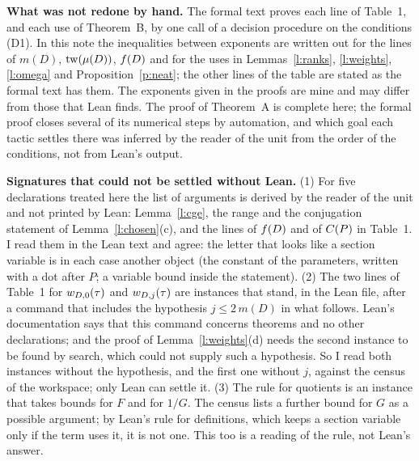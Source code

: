 \documentclass[11pt,a4paper]{article}
\newcommand{\subhead}[1]{\par\addvspace{9pt plus 2pt}\Needspace{4\baselineskip}\noindent\textbf{#1}\enspace\ignorespaces}
\theoremstyle{plainx}
\theoremstyle{uprightx}
\newcommand{\Dm}[1]{m(#1)}
\newcommand{\Dmu}[1]{\mu(#1)}
\begin{document}
\subhead{What was not redone by hand.} The formal text proves each line of Table~1, and each use of Theorem~B, by
one call of a decision procedure on the conditions (D1). In this note the inequalities between exponents are
written out for the lines of $\Dm{D}$, $\twd{\Dmu{D}}$, $f(D)$ and for the uses in Lemmas~\ref{l:ranks},
\ref{l:weights}, \ref{l:omega} and Proposition~\ref{p:neat}; the other lines of the table are stated as the formal
text has them. The exponents given in the proofs are mine and may differ from those that Lean finds. The proof
of Theorem~A is complete here; the formal proof closes several of its numerical steps by automation, and which
goal each tactic settles there was inferred by the reader of the unit from the order of the conditions, not from
Lean's output.

\subhead{Signatures that could not be settled without Lean.} (1) For five declarations treated here the list of
arguments is derived by the reader of the unit and not printed by Lean: Lemma~\ref{l:cge}, the range and the
conjugation statement of Lemma~\ref{l:chosen}(c), and the lines of $f(D)$ and of $C(P)$ in Table~1. I read them
in the Lean text and agree: the letter that looks like a section variable is in each case another object (the
constant of the parameters, written with a dot after $P$; a variable bound inside the statement). (2) The two
lines of Table~1 for $w_{D,0}(\tau)$ and $w_{D,j}(\tau)$ are instances that stand, in the Lean file, after a
command that includes the hypothesis $j\le2\,\Dm{D}$ in what follows. Lean's documentation says that this command
concerns theorems and no other declarations; and the proof of Lemma~\ref{l:weights}(d) needs the second instance
to be found by search, which could not supply such a hypothesis. So I read both instances without the hypothesis,
and the first one without $j$, against the census of the workspace; only Lean can settle it. (3) The rule for
quotients is an instance that takes bounds for $F$ and for $1/G$. The census lists a further bound for $G$ as a
possible argument; by Lean's rule for definitions, which keeps a section variable only if the term uses it, it is
not one. This too is a reading of the rule, not Lean's answer.
\end{document}
